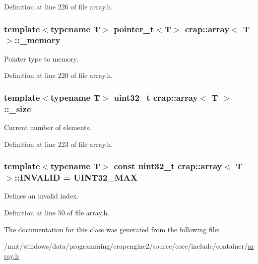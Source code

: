 Definition at line 226 of file array.\+h.

\hypertarget{classcrap_1_1array_a18129c001adcedf3644bf04e5cb6be25}{
\subsubsection[{\+\_\+memory}]{\setlength{\rightskip}{0pt plus 5cm}template$<$typename T$>$ {\bf pointer\+\_\+t}$<$T$>$ {\bf crap\+::array}$<$ T $>$\+::\+\_\+memory\hspace{0.3cm}{\ttfamily [protected]}}}\label{classcrap_1_1array_a18129c001adcedf3644bf04e5cb6be25}


Pointer type to memory. 



Definition at line 220 of file array.\+h.

\hypertarget{classcrap_1_1array_aeebbf4b3828375ad799bb6f3638b5a3f}{
\subsubsection[{\+\_\+size}]{\setlength{\rightskip}{0pt plus 5cm}template$<$typename T$>$ uint32\+\_\+t {\bf crap\+::array}$<$ T $>$\+::\+\_\+size\hspace{0.3cm}{\ttfamily [protected]}}}\label{classcrap_1_1array_aeebbf4b3828375ad799bb6f3638b5a3f}


Current number of elements. 



Definition at line 223 of file array.\+h.

\hypertarget{classcrap_1_1array_a9ad63bb5c848f0ba7ebef098a8b3a6ab}{
\subsubsection[{I\+N\+V\+A\+L\+I\+D}]{\setlength{\rightskip}{0pt plus 5cm}template$<$typename T$>$ const uint32\+\_\+t {\bf crap\+::array}$<$ T $>$\+::I\+N\+V\+A\+L\+I\+D = {\bf U\+I\+N\+T32\+\_\+\+M\+A\+X}\hspace{0.3cm}{\ttfamily [static]}}}\label{classcrap_1_1array_a9ad63bb5c848f0ba7ebef098a8b3a6ab}


Defines an invalid index. 



Definition at line 50 of file array.\+h.



The documentation for this class was generated from the following file\+:\begin{DoxyCompactItemize}
\item 
/mnt/windows/data/programming/crapengine2/source/core/include/container/\hyperlink{array_8h}{array.\+h}\end{DoxyCompactItemize}
